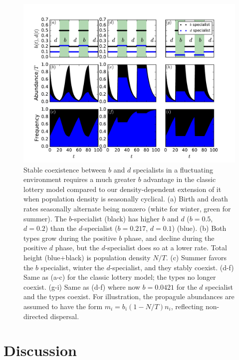 \documentclass[11pt]{article}
\begin{document}
\begin{figure}
\centering
\includegraphics[scale=0.7]{fluctuatingselection.pdf}
\caption{\label{fig:fluctuatingselection} Stable coexistence between $b$ and $d$ specialists in a fluctuating environment requires a much greater $b$ advantage in the classic lottery model compared to our density-dependent extension of it when population density is seasonally cyclical. (a) Birth and death rates seasonally alternate being nonzero (white for winter, green for summer). The $b$-specialist (black) has higher $b$ and $d$ ($b=0.5$, $d=0.2$) than the $d$-specialist ($b=0.217$, $d=0.1$) (blue). (b) Both types grow during the positive $b$ phase, and decline during the positive $d$ phase, but the $d$-specialist does so at a lower rate. Total height (blue+black) is population density $N/T$. (c) Summer favors the $b$ specialist, winter the $d$-specialist, and they stably coexist. (d-f) Same as (a-c) for the classic lottery model; the types no longer coexist. (g-i) Same as (d-f) where now $b = 0.0421$ for the $d$ specialist and the types coexist. For illustration, the propagule abundances are assumed to have the form $m_i=b_i(1-N/T)n_i$, reflecting non-directed dispersal.} 
\end{figure}




\section*{Discussion}
\end{document}
